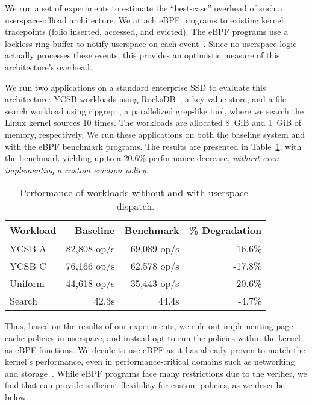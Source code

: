 We run a set of experiments to estimate the ``best-case'' overhead of such a userspace-offload architecture. We attach eBPF programs to existing kernel tracepoints (folio inserted, accessed, and evicted). The eBPF programs use a lockless ring buffer to notify userspace on each event~\cite{bpf-ringbuf}. Since no userspace logic actually processes these events, this provides an optimistic measure of this architecture's overhead.

We run two applications on a standard enterprise SSD to evaluate this architecture: YCSB workloads using RocksDB~\cite{rocksdb}, a key-value store, and a file search workload using ripgrep~\cite{ripgrep}, a parallelized grep-like tool, where we search the Linux kernel sources 10 times. The workloads are allocated 8~GiB and 1~GiB of memory, respectively. We run these applications on both the baseline system and with the eBPF benchmark programs. The results are presented in Table~\ref{tab:motivation-overhead}, with the benchmark yielding up to a 20.6\% performance decrease, \emph{without even implementing a custom eviction policy.} 

\begin{table}
    \centering
    \footnotesize
    \begin{tabular}{lrrr}
        \toprule
        Workload & Baseline    & Benchmark   & \% Degradation \\
        \midrule
        YCSB A   & 82,808 op/s & 69,089 op/s & -16.6\% \\
        YCSB C   & 76,166 op/s & 62,578 op/s & -17.8\% \\
        Uniform  & 44,618 op/s & 35,443 op/s & -20.6\% \\
        Search   &       42.3s &       44.4s &  -4.7\% \\
        \bottomrule
    \end{tabular}
    \caption{Performance of workloads without and with userspace-dispatch.}
    \label{tab:motivation-overhead}
\end{table}

Thus, based on the results of our experiments, we rule out implementing page cache policies in userspace, and instead opt to run the policies within the kernel as eBPF functions. We decide to use eBPF as it has already proven to match the kernel's performance, even in performance-critical domains such as networking~\cite{xdp} and storage~\cite{xrp}. While eBPF programs face many restrictions due to the verifier, we find that \name can provide sufficient flexibility for custom policies, as we describe below.








